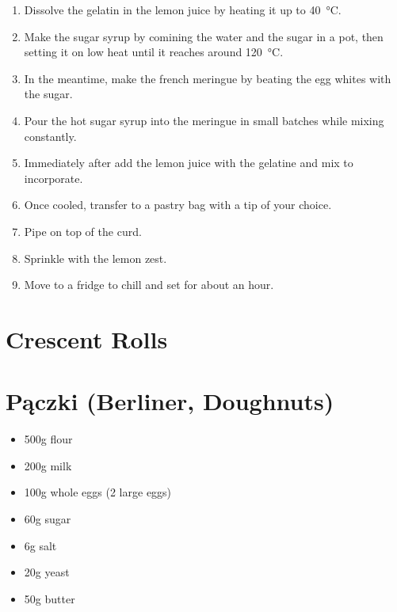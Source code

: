 
\begin{enumerate}
  \item Dissolve the gelatin in the lemon juice by heating it up to
    \SI{40}{\celsius}.
  \item Make the sugar syrup by comining the water and the sugar in a pot, then
    setting it on low heat until it reaches around \SI{120}{\celsius}.
  \item In the meantime, make the french meringue by beating the egg whites
    with the sugar.
  \item Pour the hot sugar syrup into the meringue in small batches while
    mixing constantly.
  \item Immediately after add the lemon juice with the gelatine and mix to
    incorporate.
  \item Once cooled, transfer to a pastry bag with a tip of your choice.
  \item Pipe on top of the curd.
  \item Sprinkle with the lemon zest.
  \item Move to a fridge to chill and set for about an hour.
\end{enumerate}

\section{Crescent Rolls}

\section{Pączki (Berliner, Doughnuts)}
\begin{itemize}
  \item 500g flour
  \item 200g milk
  \item 100g whole eggs (2 large eggs)
  \item 60g sugar
  \item 6g salt
  \item 20g yeast
  \item 50g butter
\end{itemize}

